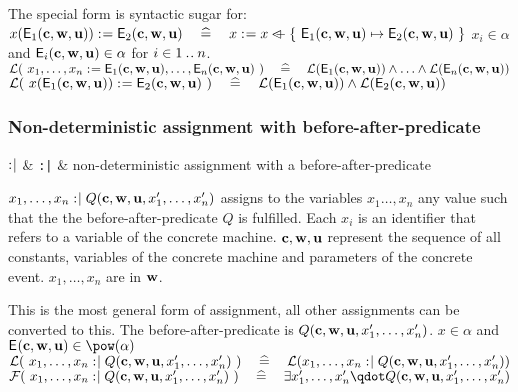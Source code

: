 \begin{samepage}
\begin{rodinrefentry}
    The special form is syntactic sugar for:\\
    $x(\textsf{E}_{1}(\mathbf{c},\mathbf{w},\mathbf{u})) \mathrel{:\mkern1mu=} \textsf{E}_{2}(\mathbf{c},\mathbf{w},\mathbf{u})
      \quad\mathrel{\widehat=}\quad 
      x \mathrel{:\mkern1mu=} x \mathbin{\lhd\mkern-9mu-} \{~\textsf{E}_{1}(\mathbf{c},\mathbf{w},\mathbf{u}) \mapsto \textsf{E}_{2}(\mathbf{c},\mathbf{w},\mathbf{u})~\}$
  \rrtypes
    $x_i\in\alpha$ and  $\textsf{E}_{i}(\mathbf{c},\mathbf{w},\mathbf{u})\in\alpha$ for $i \in 1\mathbin{.\mkern1mu.} n$.
  \rrwd
    $\mathcal{L}(~x_1,\ldots,x_n \mathrel{:\mkern1mu=} \textsf{E}_{1}(\mathbf{c},\mathbf{w},\mathbf{u}),\ldots,\textsf{E}_{n}(\mathbf{c},\mathbf{w},\mathbf{u})~)
      \quad\mathrel{\widehat=}\quad 
      \mathcal{L}(\textsf{E}_{1}(\mathbf{c},\mathbf{w},\mathbf{u})) \land \ldots \land \mathcal{L}(\textsf{E}_{n}(\mathbf{c},\mathbf{w},\mathbf{u}))$ \\
    $\mathcal{L}(~x(\textsf{E}_{1}(\mathbf{c},\mathbf{w},\mathbf{u})) \mathrel{:\mkern1mu=} \textsf{E}_{2}(\mathbf{c},\mathbf{w},\mathbf{u})~)
    \quad\mathrel{\widehat=}\quad 
    \mathcal{L}(\textsf{E}_{1}(\mathbf{c},\mathbf{w},\mathbf{u})) \land \mathcal{L}(\textsf{E}_{2}(\mathbf{c},\mathbf{w},\mathbf{u}))$
\end{rodinrefentry}
\end{samepage}

\begin{samepage}
\subsubsection{Non-deterministic assignment with before-after-predicate}
\label{nondeterministic_assignments}
\begin{rrnames}
  $\mathrel{:\mkern1mu\mid}$ & \texttt{:|} & non-deterministic assignment with a before-after-predicate
\end{rrnames}
\begin{rodinrefentry}
  \rrdesc
    $x_1,\ldots,x_n \mathrel{:\mkern1mu\mid} Q(\mathbf{c},\mathbf{w},\mathbf{u},x_1',\ldots,x_n')$
    assigns to the variables $x_1\ldots,x_n$ any value such that the the
    before-after-predicate $Q$ is fulfilled.
    Each $x_i$ is an identifier that refers to a variable of the concrete machine.
    $\mathbf{c},\mathbf{w},\mathbf{u}$ represent the sequence of all constants, 
    variables of the concrete machine and parameters of the concrete event.
    $x_1,\ldots,x_n$ are in $\mathbf{w}$.

    This is the most general form of assignment, all other assignments can be converted to this.
  \rrdef
    The before-after-predicate is $Q(\mathbf{c},\mathbf{w},\mathbf{u},x_1',\ldots,x_n')$.
  \rrtypes
    $x\in\alpha$ and $\eventbassignmentexpr{}\in\pow(\alpha)$
  \rrwd
    $\mathcal{L}(~x_1,\ldots,x_n \mathrel{:\mkern1mu\mid} Q(\mathbf{c},\mathbf{w},\mathbf{u},x_1',\ldots,x_n')~)
    \quad\mathrel{\widehat=}\quad
    \mathcal{L}(x_1,\ldots,x_n \mathrel{:\mkern1mu\mid} Q(\mathbf{c},\mathbf{w},\mathbf{u},x_1',\ldots,x_n'))$
  \rrfis
    $\actfis(~x_1,\ldots,x_n \bcmsuch Q(\allconstants,\concvariables,\concparameters,x_1',\ldots,x_n')~)
      \quad\defi\quad
      \exists x_1',\ldots,x_n' \qdot Q(\allconstants,\concvariables,\concparameters,x_1',\ldots,x_n')$
\end{rodinrefentry}
\end{samepage}


